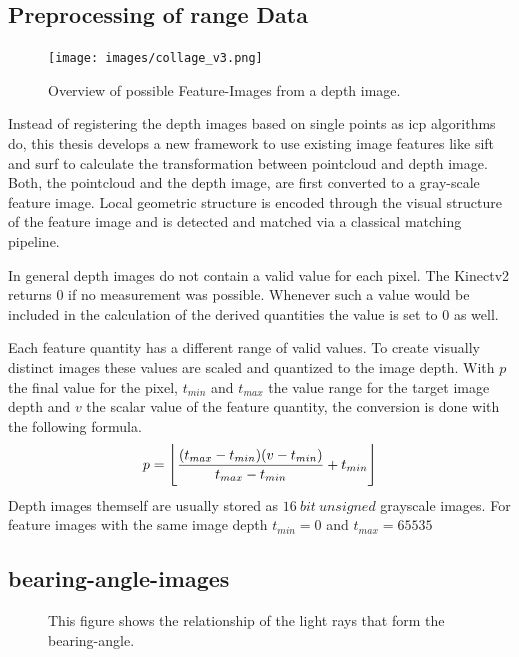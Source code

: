 \documentclass[doktyp=marbeit,fontsize=12pt,sprache=english,draft=true,hausschrift=true,fleqn]{TUBAFarbeiten}
\DeclarePairedDelimiter{\floor}{\lfloor}{\rfloor}
\begin{document}
\subsection{Preprocessing of range Data}\label{preprocessing-of-range-data}

\begin{figure}[H]
    \centering
    \texttt{[image: images/collage\_v3.png]}
    \caption{Overview of possible Feature-Images from a depth image.}
\end{figure}

Instead of registering the depth images based on single points as \gls{icp} algorithms do, this thesis develops a new framework to use existing image features like \Gls{sift} and \Gls{surf} to calculate the transformation between pointcloud and depth image.
Both, the pointcloud and the depth image, are first converted to a gray-scale feature image.
Local geometric structure is encoded through the visual structure of the feature image and is detected and matched via a classical matching pipeline.

In general depth images do not contain a valid value for each pixel.
The Kinectv2 returns $0$ if no measurement was possible.
Whenever such a value would be included in the calculation of the derived quantities the value is set to $0$ as well.

Each feature quantity has a different range of valid values.
To create visually distinct images these values are scaled and quantized to the image depth.
With $p$ the final value for the pixel, $t_{min}$ and $t_{max}$ the value range for the target image depth and $v$ the scalar value of the feature quantity, the conversion is done with the following formula.
\begin{align}
    p = \floor[\Bigg]{\frac{{(t_{max} - t_{min})} {(v - t_{min})}}{t_{max} - t_{min}} + t_{min}}
\end{align}
Depth images themself are usually stored as $16~bit~unsigned$ grayscale images.
For feature images with the same image depth $t_{min} = 0$ and $t_{max} = 65535$

\subsection{\Glspl{bearing-angle-image}}

\begin{figure}[H]
    \centering
    \caption[Schematic Representation of Bearing-Angles]{This figure shows the relationship of the light rays that form the \gls{bearing-angle}.}
\end{figure}
\end{document}
